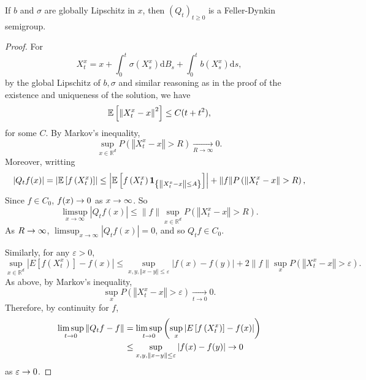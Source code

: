 \begin{thm}
    If $b$ and $\sigma$ are globally Lipschitz in $x$, then $(Q_t)_{t \geq 0}$ is a Feller-Dynkin semigroup.
\end{thm}
\begin{proof}
    For
    \begin{equation*}
        X_t^x = x + \int_0^t \sigma\left(X_s^x\right) \mathrm{d} B_s+\int_0^t b\left(X_s^x\right) \mathrm{d} s,
    \end{equation*}
    by the global Lipschitz of $b,\sigma$ and similar reasoning as in the proof of the existence and uniqueness of the solution, we have
    \begin{equation*}
        \mathbb{E}\left[\left\lVert X_t^x-x\right\lVert^2\right] \leq C(t + t^2),
    \end{equation*}
    for some $C$. By Markov's inequality,
    \begin{equation*}
        \sup _{x \in \mathbb{R}^d} P\left(\left \Vert X_t^x-x\right \Vert >R\right) \underset{R \rightarrow \infty}{\longrightarrow} 0 .
    \end{equation*}
    Moreover, writting
    \begin{equation*}
        \left|Q_t f(x)\right|=\left|\mathbb{E}\left[f\left(X_t^x\right)\right]\right| \leq\left|\mathbb{E}\left[f\left(X_t^x\right) \mathbf{1}_{\left\{\left \Vert X_t^x-x\right \Vert  \leq A\right\}}\right]\right|+\|f\| P\left(\left\Vert X_t^x-x\right\Vert >R\right),
    \end{equation*}
    Since $f \in C_0$, $f(x) \rightarrow 0$ as $x \rightarrow \infty$. So
    \begin{equation*}
        \limsup _{x \rightarrow \infty}\left|Q_t f(x)\right| \leq\|f\| \sup _{x \in \mathbb{R}^d} P\left(\left\Vert X_t^x-x\right\Vert >R\right).
    \end{equation*}
    As $R \rightarrow \infty$, $\limsup _{x \rightarrow \infty}\left|Q_t f(x)\right| = 0$, and so $Q_tf \in C_0$.

    Similarly, for any $\varepsilon > 0$,
    \begin{equation*}
        \sup _{x \in \mathbb{R}^d}\left|E\left[f\left(X_t^x\right)\right]-f(x)\right| \leq \sup _{x, y,\Vert x-y\Vert  \leq \varepsilon}|f(x)-f(y)|+2\|f\| \sup _{x} P\left(\left\Vert X_t^x-x\right\Vert >\varepsilon\right) .
    \end{equation*}
    As above, by Markov's inequality,
    \begin{equation*}
        \sup _{x } P\left(\left\Vert X_t^x-x\right\Vert >\varepsilon\right) \underset{t \rightarrow 0}{\longrightarrow} 0.
    \end{equation*}
    Therefore, by continuity for $f$,
    \begin{align*}
        \limsup _{t \rightarrow 0}\left\|Q_t f-f\right\|&=\limsup _{t \rightarrow 0}\left(\sup _{x}\left|E\left[f\left(X_t^x\right)\right]-f(x)\right|\right) \\
        &\leq \sup _{x, y,\Vert x-y\Vert  \leq \varepsilon}|f(x)-f(y)| \rightarrow 0
    \end{align*}
    as $\varepsilon \rightarrow 0$. \qedhere
\end{proof}
